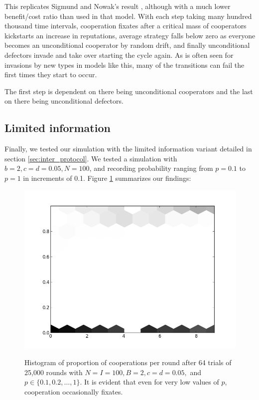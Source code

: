 \documentclass{amsart}
\begin{document}
This replicates Sigmund and Nowak's result
\cite{nowak_evolution_1998}, although with a much lower benefit/cost
ratio than used in that model. With each step taking many hundred
thousand time intervals, cooperation fixates after a critical mass of
cooperators kickstarts an increase in reputations, average strategy
falls below zero as everyone becomes an unconditional cooperator by
random drift, and finally unconditional defectors invade and take over
starting the cycle again. As is often seen for invasions by new types
in models like this, many of the transitions can fail the first times
they start to occur.

The first step is dependent on there being unconditional cooperators
and the last on there being unconditional defectors.

\subsection{Limited information}

Finally, we tested our simulation with the limited information variant
detailed in section \ref{sec:inter_protocol}. We tested a simulation
with $b=2, c=d=0.05, N=100$, and recording probability ranging from
$p=0.1$ to $p=1$ in increments of 0.1. Figure \ref{fig:gos} summarizes our findings:

\begin{figure}[h]
\caption{Histogram of proportion of cooperations per round after 64
  trials of 25,000 rounds with $N=I=100, B=2,c=d=0.05,$ and $p \in
  \{0.1,0.2,\dots,1\}$. It is evident that even for very low values of
  $p$, cooperation occasionally fixates.}

\includegraphics[width=\textwidth]{GOS.png}
\label{fig:gos}
\end{figure}
\end{document}
